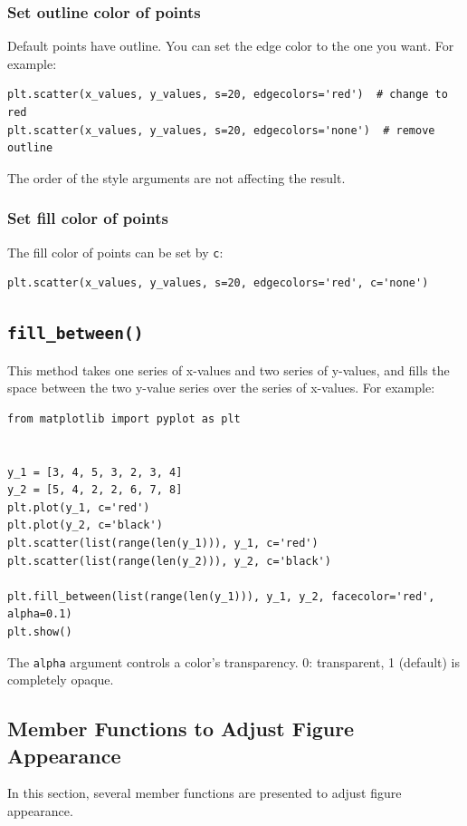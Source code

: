 \documentclass[12pt]{book}
\begin{document}
\subsubsection{Set outline color of points}
\label{sec:orgb770257}
Default points have outline. You can set the edge color to the one you want. For example:
\begin{verbatim}
plt.scatter(x_values, y_values, s=20, edgecolors='red')  # change to red
plt.scatter(x_values, y_values, s=20, edgecolors='none')  # remove outline
\end{verbatim}
The order of the style arguments are not affecting the result.

\subsubsection{Set fill color of points}
\label{sec:org95d6204}
The fill color of points can be set by \texttt{c}:
\begin{verbatim}
plt.scatter(x_values, y_values, s=20, edgecolors='red', c='none')
\end{verbatim}

\subsection{\texttt{fill\_between()}}
\label{sec:orgc1c0682}
This method takes one series of x-values and two series of y-values, and fills the space between the two y-value series over the series of x-values. For example:
\begin{verbatim}
from matplotlib import pyplot as plt


y_1 = [3, 4, 5, 3, 2, 3, 4]
y_2 = [5, 4, 2, 2, 6, 7, 8]
plt.plot(y_1, c='red')
plt.plot(y_2, c='black')
plt.scatter(list(range(len(y_1))), y_1, c='red')
plt.scatter(list(range(len(y_2))), y_2, c='black')

plt.fill_between(list(range(len(y_1))), y_1, y_2, facecolor='red', alpha=0.1)
plt.show()
\end{verbatim}

The \texttt{alpha} argument controls a color's transparency. 0: transparent, 1 (default) is completely opaque.

\subsection{Member Functions to Adjust Figure Appearance}
\label{sec:orgcd4ea01}
In this section, several member functions are presented to adjust figure appearance.
\end{document}
